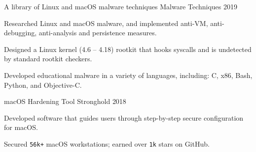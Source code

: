 
\begin{cventries}
\cventry
{A library of Linux and macOS malware techniques} %
{Malware Techniques} %
{2019} %
{} %
{
	\begin{cvitems} %
		\item {Researched Linux and macOS malware, and implemented anti-VM, anti-debugging, anti-analysis and persistence measures.}
		\item {Designed a Linux kernel (4.6 -- 4.18) rootkit that hooks syscalls and is undetected by standard rootkit checkers.}
		\item {Developed educational malware in a variety of languages, including: C, x86, Bash, Python, and Objective-C.}
	\end{cvitems}
}


\cventry
{macOS Hardening Tool} %
{Stronghold} %
{2018} %
{} %
{
	\begin{cvitems} %
		\item {Developed software that guides users through step-by-step secure configuration for macOS.}
		\item {Secured \texttt{56k+} macOS workstations; earned over \texttt{1k} stars on GitHub.}
	\end{cvitems}
}


\end{cventries}
